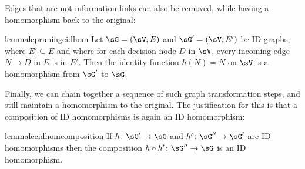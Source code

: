 Edges that are not information links can also be removed, while having a homomorphism back to the original:



\begin{restatable}{lemma}{lepruningcidhom} \label{le:21may19.2-CID-hom-from-edge-pruning}
Let $\sG=(\sV,E)$ and $\sG'=(\sV,E')$ be ID graphs, where $E'\subseteq E$ and where for each decision node $D$ in $\sV$, every incoming edge $N\to D$ in $E$ is in $E'$. Then the identity function $h(N)=N$ on $\sV$ is a homomorphism from $\sG'$ to $\sG$.
\end{restatable}

Finally, we can chain together a sequence of such graph transformation steps, and still maintain a homomorphism to the original. The justification for this is that a composition of ID homomorphisms is again an ID homomorphism:~

\begin{restatable}[Composition]{lemma}{lecidhomcomposition} \label{le:20dec7.1-composition-of-CID-splits}
If $h\colon\sG' \to \sG$ and $h'\colon\sG'' \to \sG'$ are ID homomorphisms then the composition $h \circ h'\colon\sG'' \to \sG$ is an ID homomorphism.
\end{restatable}